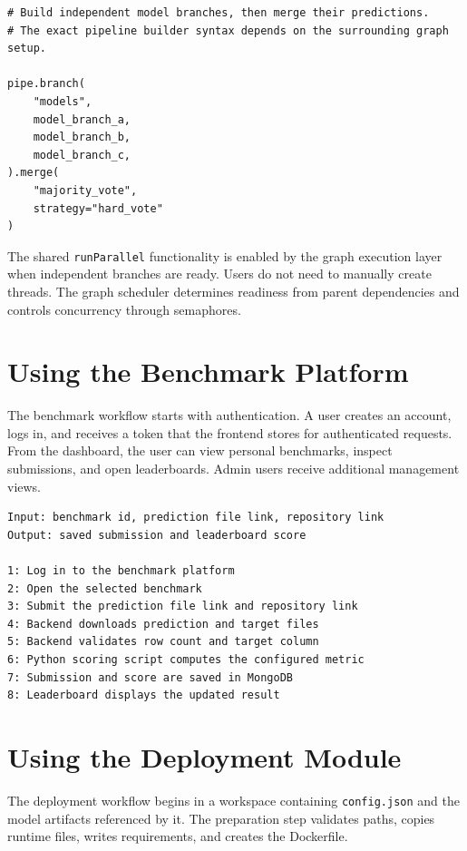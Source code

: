 \documentclass[12pt,a4paper,oneside]{report}
\newcommand{\modulepath}[1]{\texttt{#1}}
\begin{document}
\begin{lstlisting}[style=paperpython,caption={Conceptual use of a merge node in a graph workflow}]
# Build independent model branches, then merge their predictions.
# The exact pipeline builder syntax depends on the surrounding graph setup.

pipe.branch(
    "models",
    model_branch_a,
    model_branch_b,
    model_branch_c,
).merge(
    "majority_vote",
    strategy="hard_vote"
)
\end{lstlisting}

The shared \modulepath{runParallel} functionality is enabled by the graph execution layer when independent branches are ready. Users do not need to manually create threads. The graph scheduler determines readiness from parent dependencies and controls concurrency through semaphores.

\section{Using the Benchmark Platform}
The benchmark workflow starts with authentication. A user creates an account, logs in, and receives a token that the frontend stores for authenticated requests. From the dashboard, the user can view personal benchmarks, inspect submissions, and open leaderboards. Admin users receive additional management views.

\begin{lstlisting}[style=algostyle,caption={Benchmark submission workflow from the user perspective}]
Input: benchmark id, prediction file link, repository link
Output: saved submission and leaderboard score

1: Log in to the benchmark platform
2: Open the selected benchmark
3: Submit the prediction file link and repository link
4: Backend downloads prediction and target files
5: Backend validates row count and target column
6: Python scoring script computes the configured metric
7: Submission and score are saved in MongoDB
8: Leaderboard displays the updated result
\end{lstlisting}

\section{Using the Deployment Module}
The deployment workflow begins in a workspace containing \modulepath{config.json} and the model artifacts referenced by it. The preparation step validates paths, copies runtime files, writes requirements, and creates the Dockerfile.
\end{document}
